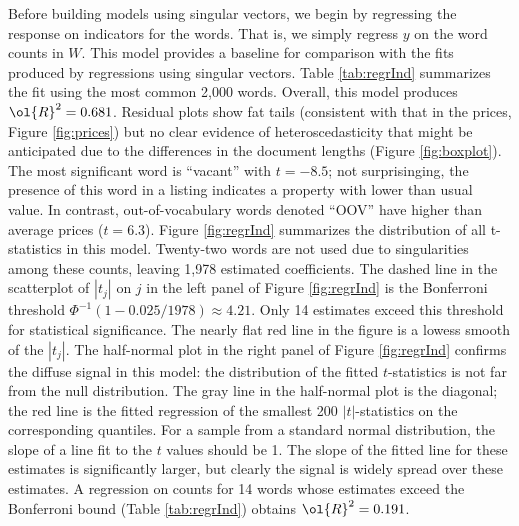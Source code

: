\documentclass[12pt]{article}
\begin{document}
Before building models using singular vectors, we begin by regressing the response on indicators for the words.  That is, we simply regress $y$ on the word counts in $W$.  This model provides a baseline for comparison with the fits produced by regressions using singular vectors.  Table \ref{tab:regrInd} summarizes the fit using the most common 2,000 words.  Overall, this model produces $\ol{R}^2 = 0.681$.  Residual plots show fat tails (consistent with that in the prices, Figure \ref{fig:prices}) but no clear evidence of heteroscedasticity that might be anticipated due to the differences in the document lengths (Figure \ref{fig:boxplot}).  The most significant word is ``vacant'' with $t=-8.5$; not surprisinging, the presence of this word in a listing indicates a property with lower than usual value.  In contrast, out-of-vocabulary words denoted ``OOV'' have higher than average prices ($t=6.3$). Figure \ref{fig:regrInd} summarizes the distribution of all t-statistics in this model.  Twenty-two words are not used due to singularities among these counts, leaving 1,978 estimated coefficients.  The dashed line in the scatterplot of $|t_j|$ on $j$ in the left panel of Figure \ref{fig:regrInd} is the Bonferroni threshold $\Phi^{-1}(1-0.025/1978) \approx 4.21$.  Only 14 estimates exceed this threshold for statistical significance.  The nearly flat red line in the figure is a lowess smooth of the $|t_j|$.  The half-normal plot in the right panel of Figure \ref{fig:regrInd} confirms the diffuse signal in this model: the distribution of the fitted $t$-statistics is not far from the null distribution.  The gray line in the half-normal plot is the diagonal; the red line is the fitted regression of the smallest 200  $|t|$-statistics on the corresponding quantiles.  For a sample from a standard normal distribution, the slope of a line fit to the $t$ values should be 1.  The slope of the fitted line for these estimates is significantly larger, but clearly the signal is widely spread over these estimates.  A regression on counts for 14 words whose estimates exceed the Bonferroni bound (Table \ref{tab:regrInd}) obtains $\ol{R}^2 = 0.191$.  
\end{document}
